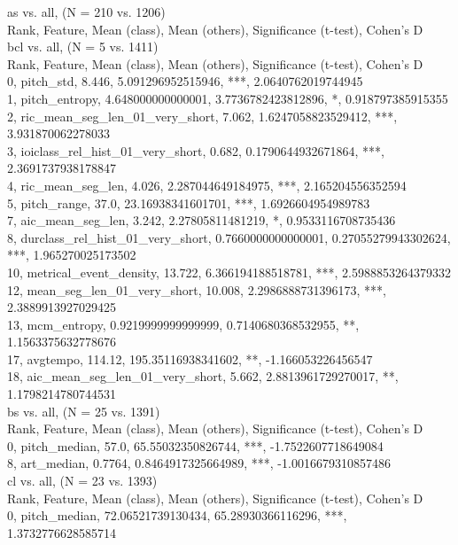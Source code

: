 as vs. all, (N = 210 vs. 1206)\\
Rank, Feature, Mean (class), Mean (others), Significance (t-test), Cohen's D\\
bcl vs. all, (N = 5 vs. 1411)\\
Rank, Feature, Mean (class), Mean (others), Significance (t-test), Cohen's D\\
0, pitch_std, 8.446, 5.091296952515946, ***, 2.0640762019744945\\
1, pitch_entropy, 4.648000000000001, 3.7736782423812896, *, 0.918797385915355\\
2, ric_mean_seg_len_01_very_short, 7.062, 1.6247058823529412, ***, 3.931870062278033\\
3, ioiclass_rel_hist_01_very_short, 0.682, 0.1790644932671864, ***, 2.3691737938178847\\
4, ric_mean_seg_len, 4.026, 2.287044649184975, ***, 2.165204556352594\\
5, pitch_range, 37.0, 23.16938341601701, ***, 1.6926604954989783\\
7, aic_mean_seg_len, 3.242, 2.27805811481219, *, 0.9533116708735436\\
8, durclass_rel_hist_01_very_short, 0.7660000000000001, 0.27055279943302624, ***, 1.965270025173502\\
10, metrical_event_density, 13.722, 6.366194188518781, ***, 2.5988853264379332\\
12, mean_seg_len_01_very_short, 10.008, 2.2986888731396173, ***, 2.3889913927029425\\
13, mcm_entropy, 0.9219999999999999, 0.7140680368532955, **, 1.1563375632778676\\
17, avgtempo, 114.12, 195.35116938341602, **, -1.166053226456547\\
18, aic_mean_seg_len_01_very_short, 5.662, 2.8813961729270017, **, 1.1798214780744531\\
bs vs. all, (N = 25 vs. 1391)\\
Rank, Feature, Mean (class), Mean (others), Significance (t-test), Cohen's D\\
0, pitch_median, 57.0, 65.55032350826744, ***, -1.7522607718649084\\
8, art_median, 0.7764, 0.8464917325664989, ***, -1.0016679310857486\\
cl vs. all, (N = 23 vs. 1393)\\
Rank, Feature, Mean (class), Mean (others), Significance (t-test), Cohen's D\\
0, pitch_median, 72.06521739130434, 65.28930366116296, ***, 1.3732776628585714\\
